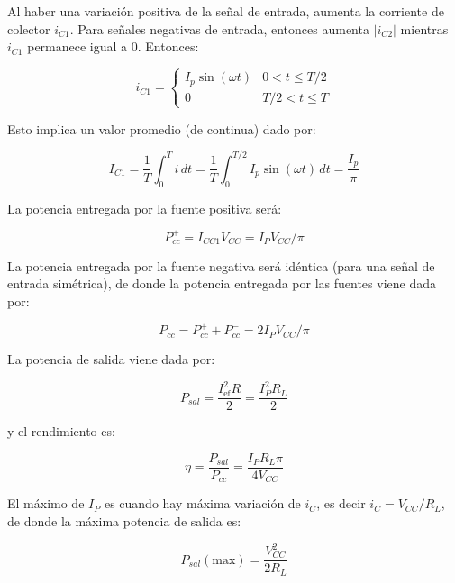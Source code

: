 Al haber una variación positiva de la señal de entrada, aumenta la corriente de colector $i_{C1}$. Para señales negativas de entrada, entonces aumenta $|i_{C2}|$ mientras $i_{C1}$ permanece igual a 0. Entonces:

\begin{equation}
	i_{C1} = 
	\begin{cases}
		I_p \sin(\omega t) & 0 < t \leq T/2 \\
		0 & T/2 < t \leq T
	\end{cases}
\end{equation}

Esto implica un valor promedio (de continua) dado por:

\begin{equation}
	I_{C1} = \frac{1}{T} \int_0^T i \, dt = \frac{1}{T} \int_0^{T/2} I_p \sin(\omega t) \, dt = \frac{I_p}{\pi}
\end{equation}

La potencia entregada por la fuente positiva será:

\begin{equation}
	P_{cc}^{+} = I_{CC1} V_{CC} = I_P V_{CC} / \pi
\end{equation}

La potencia entregada por la fuente negativa será idéntica (para una señal de entrada simétrica), de donde la potencia entregada por las fuentes viene dada por:

\begin{equation}
	P_{cc} = P_{cc}^{+} + P_{cc}^{-} = 2 I_P V_{CC} / \pi
\end{equation}

La potencia de salida viene dada por:

\begin{equation}
	P_{sal} = \frac{I_{\text{ef}}^2 R}{2} = \frac{I_P^2 R_L}{2}
\end{equation}

y el rendimiento es:

\begin{equation}
	\eta = \frac{P_{sal}}{P_{cc}} = \frac{I_P R_L \pi}{4 V_{CC}}
\end{equation}

El máximo de $I_P$ es cuando hay máxima variación de $i_C$, es decir $i_C = V_{CC} / R_L$, de donde la máxima potencia de salida es:

\begin{equation}
	P_{sal}(\text{max}) = \frac{V_{CC}^2}{2 R_L}
\end{equation}

